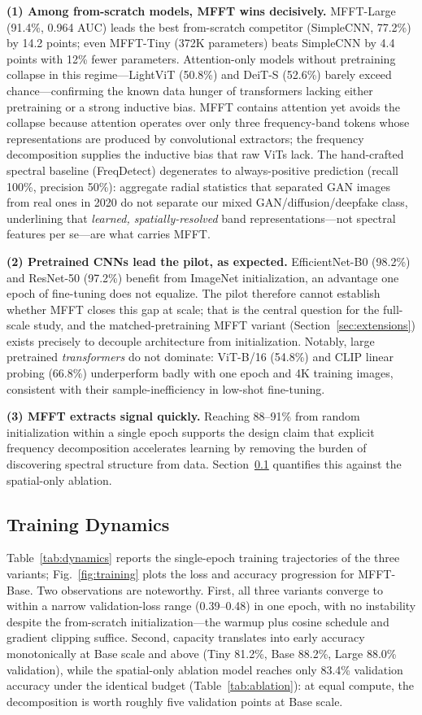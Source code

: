 \documentclass[journal]{IEEEtran}
\begin{document}
\textbf{(1) Among from-scratch models, MFFT wins decisively.} MFFT-Large (91.4\%, 0.964 AUC) leads the best from-scratch competitor (SimpleCNN, 77.2\%) by 14.2 points; even MFFT-Tiny (372K parameters) beats SimpleCNN by 4.4 points with 12\% fewer parameters. Attention-only models without pretraining collapse in this regime---LightViT (50.8\%) and DeiT-S (52.6\%) barely exceed chance---confirming the known data hunger of transformers lacking either pretraining or a strong inductive bias. MFFT contains attention yet avoids the collapse because attention operates over only three frequency-band tokens whose representations are produced by convolutional extractors; the frequency decomposition supplies the inductive bias that raw ViTs lack. The hand-crafted spectral baseline (FreqDetect) degenerates to always-positive prediction (recall 100\%, precision 50\%): aggregate radial statistics that separated GAN images from real ones in 2020 do not separate our mixed GAN/diffusion/deepfake class, underlining that \emph{learned, spatially-resolved} band representations---not spectral features per se---are what carries MFFT.

\textbf{(2) Pretrained CNNs lead the pilot, as expected.} EfficientNet-B0 (98.2\%) and ResNet-50 (97.2\%) benefit from ImageNet initialization, an advantage one epoch of fine-tuning does not equalize. The pilot therefore cannot establish whether MFFT closes this gap at scale; that is the central question for the full-scale study, and the matched-pretraining MFFT variant (Section~\ref{sec:extensions}) exists precisely to decouple architecture from initialization. Notably, large pretrained \emph{transformers} do not dominate: ViT-B/16 (54.8\%) and CLIP linear probing (66.8\%) underperform badly with one epoch and 4K training images, consistent with their sample-inefficiency in low-shot fine-tuning.

\textbf{(3) MFFT extracts signal quickly.} Reaching 88--91\% from random initialization within a single epoch supports the design claim that explicit frequency decomposition accelerates learning by removing the burden of discovering spectral structure from data. Section~\ref{sec:dynamics} quantifies this against the spatial-only ablation.

\subsection{Training Dynamics}
\label{sec:dynamics}
Table~\ref{tab:dynamics} reports the single-epoch training trajectories of the three variants; Fig.~\ref{fig:training} plots the loss and accuracy progression for MFFT-Base. Two observations are noteworthy. First, all three variants converge to within a narrow validation-loss range (0.39--0.48) in one epoch, with no instability despite the from-scratch initialization---the warmup plus cosine schedule and gradient clipping suffice. Second, capacity translates into early accuracy monotonically at Base scale and above (Tiny 81.2\%, Base 88.2\%, Large 88.0\% validation), while the spatial-only ablation model reaches only 83.4\% validation accuracy under the identical budget (Table~\ref{tab:ablation}): at equal compute, the decomposition is worth roughly five validation points at Base scale.
\end{document}
